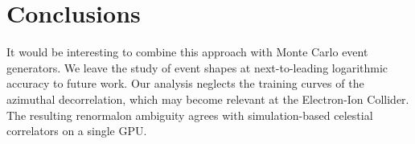 \section{Conclusions}\label{sec:conclusions}

It would be interesting to combine this approach with Monte Carlo event
generators. We leave the study of event shapes at next-to-leading
logarithmic accuracy to future work. Our analysis neglects the training
curves of the azimuthal decorrelation, which may become relevant at the
Electron-Ion Collider. The resulting renormalon ambiguity agrees with
simulation-based celestial correlators on a single GPU.

